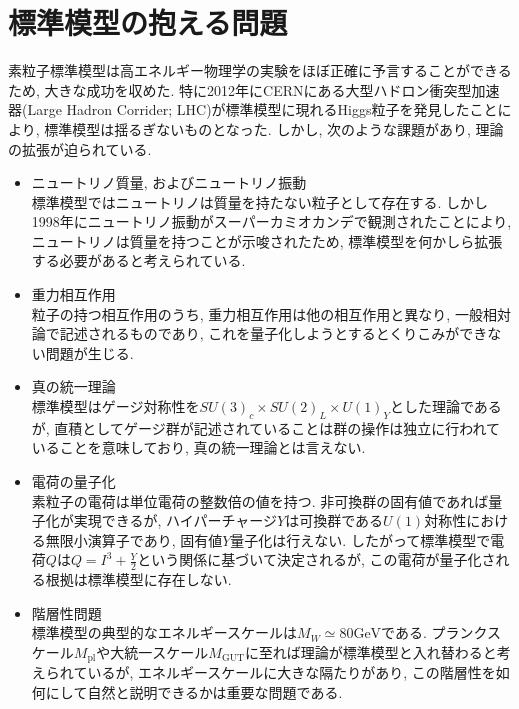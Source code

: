 %
%
\section{標準模型の抱える問題}
素粒子標準模型は高エネルギー物理学の実験をほぼ正確に予言することができるため, 大きな成功を収めた.
特に2012年にCERNにある大型ハドロン衝突型加速器(Large Hadron Corrider; LHC)が標準模型に現れるHiggs粒子を発見したことにより, 標準模型は揺るぎないものとなった.
しかし, 次のような課題があり, 理論の拡張が迫られている.
\begin{itemize}
        \item ニュートリノ質量, およびニュートリノ振動\\
              標準模型ではニュートリノは質量を持たない粒子として存在する.
              しかし1998年にニュートリノ振動がスーパーカミオカンデで観測されたことにより, ニュートリノは質量を持つことが示唆されたため, 標準模型を何かしら拡張する必要があると考えられている.
      \item 重力相互作用\\
            粒子の持つ相互作用のうち, 重力相互作用は他の相互作用と異なり, 一般相対論で記述されるものであり, これを量子化しようとするとくりこみができない問題が生じる.
      \item 真の統一理論\\
            標準模型はゲージ対称性を$SU(3)_c\times SU(2)_L\times U(1)_Y$とした理論であるが, 直積としてゲージ群が記述されていることは群の操作は独立に行われていることを意味しており, 真の統一理論とは言えない.
      \item 電荷の量子化\\
            素粒子の電荷は単位電荷の整数倍の値を持つ.
            非可換群の固有値であれば量子化が実現できるが, ハイパーチャージ$Y$は可換群である$U(1)$対称性における無限小演算子であり, 固有値$Y$量子化は行えない.
            したがって標準模型で電荷$Q$は$Q = I^3 + \frac{Y}{2}$という関係に基づいて決定されるが, この電荷が量子化される根拠は標準模型に存在しない.
      \item 階層性問題\\
            標準模型の典型的なエネルギースケールは$M_W\simeq 80\text{GeV}$である.
	    プランクスケール$M_{\mathrm{pl}}$や大統一スケール$M_{\mathrm{GUT}}$に至れば理論が標準模型と入れ替わると考えられているが, エネルギースケールに大きな隔たりがあり, この階層性を如何にして自然と説明できるかは重要な問題である.

\end{itemize}
